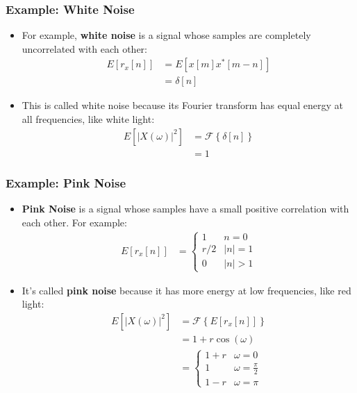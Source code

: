 \documentclass{beamer}
\begin{document}
\begin{frame}
  \frametitle{Example: White Noise}

  \begin{itemize}
  \item For example, \textbf{white noise} is a signal whose samples
    are completely uncorrelated with each other:
    \begin{align*}
      E\left[r_x[n]\right] &= E\left[x[m]x^*[m-n]\right]\\
      &= \delta[n]
    \end{align*}
  \item This is called white noise because its Fourier transform has
    equal energy at all frequencies, like white light:
    \begin{align*}
      E\left[|X(\omega)|^2\right] &=
      \mathcal{F}\left\{\delta[n]\right\}\\ &= 1
    \end{align*}
  \end{itemize}
\end{frame}

\begin{frame}
  \frametitle{Example: Pink Noise}
  \begin{itemize}
  \item \textbf{Pink Noise} is a signal whose samples have a small positive
    correlation with each other.  For example:
    \begin{align*}
      E\left[r_x[n]\right] &= \begin{cases}
        1 & n=0\\
        r/2 & |n|=1\\
        0 & |n|>1
      \end{cases}
    \end{align*}
  \item It's called \textbf{pink noise} because it has more energy at
    low frequencies, like red light:
    \begin{align*}
      E\left[|X(\omega)|^2\right] &=
      \mathcal{F}\left\{E\left[r_x[n]\right]\right\}\\
      &= 1+r\cos(\omega)\\
      &=\begin{cases}1+r & \omega=0\\
      1 &\omega=\frac{\pi}{2}\\
      1-r &\omega=\pi
      \end{cases}
    \end{align*}
  \end{itemize}
\end{frame}
\end{document}
